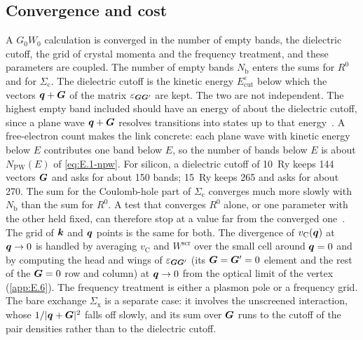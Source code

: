 \subsection{Convergence and cost}

A $G_0W_0$ calculation is converged in the number of empty bands, the dielectric cutoff, the grid of crystal momenta and the frequency treatment, and these parameters are coupled. The number of empty bands $N_{\mathrm{b}}$ enters the sums for $R^0$ and for $\Sigma_{\mathrm{c}}$. The dielectric cutoff is the kinetic energy $E^{\varepsilon}_{\mathrm{cut}}$ below which the vectors $\bm{q} + \bm{G}$ of the matrix $\varepsilon_{\bm{G}\bm{G}'}$ are kept. The two are not independent. The highest empty band included should have an energy of about the dielectric cutoff, since a plane wave $\bm{q} + \bm{G}$ resolves transitions into states up to that energy~\cite[Sect.~4]{deslippe2012berkeleygw}. A free-electron count makes the link concrete: each plane wave with kinetic energy below $E$ contributes one band below $E$, so the number of bands below $E$ is about $N_{\mathrm{PW}}(E)$ of \cref{eq:E.1-npw}. For silicon, a dielectric cutoff of \SI{10}{Ry} keeps 144 vectors $\bm{G}$ and asks for about 150 bands; \SI{15}{Ry} keeps 265 and asks for about 270. The sum for the Coulomb-hole part of $\Sigma_{\mathrm{c}}$ converges much more slowly with $N_{\mathrm{b}}$ than the sum for $R^0$. A test that converges $R^0$ alone, or one parameter with the other held fixed, can therefore stop at a value far from the converged one~\cite[Sect.~4 and Fig.~8]{deslippe2012berkeleygw}. The grid of $\bm{k}$ and $\bm{q}$ points is the same for both. The divergence of $v_{\mathrm{C}}(\bm{q})$ at $\bm{q} \to 0$ is handled by averaging $v_{\mathrm{C}}$ and $W^{\mathrm{scr}}$ over the small cell around $\bm{q} = 0$ and by computing the head and wings of $\varepsilon_{\bm{G}\bm{G}'}$ (its $\bm{G} = \bm{G}' = 0$ element and the rest of the $\bm{G} = 0$ row and column) at $\bm{q} \to 0$ from the optical limit of the vertex (\cref{app:E.6}). The frequency treatment is either a plasmon pole or a frequency grid. The bare exchange $\Sigma_{\mathrm{x}}$ is a separate case: it involves the unscreened interaction, whose $1/|\bm{q} + \bm{G}|^2$ falls off slowly, and its sum over $\bm{G}$ runs to the cutoff of the pair densities rather than to the dielectric cutoff.

